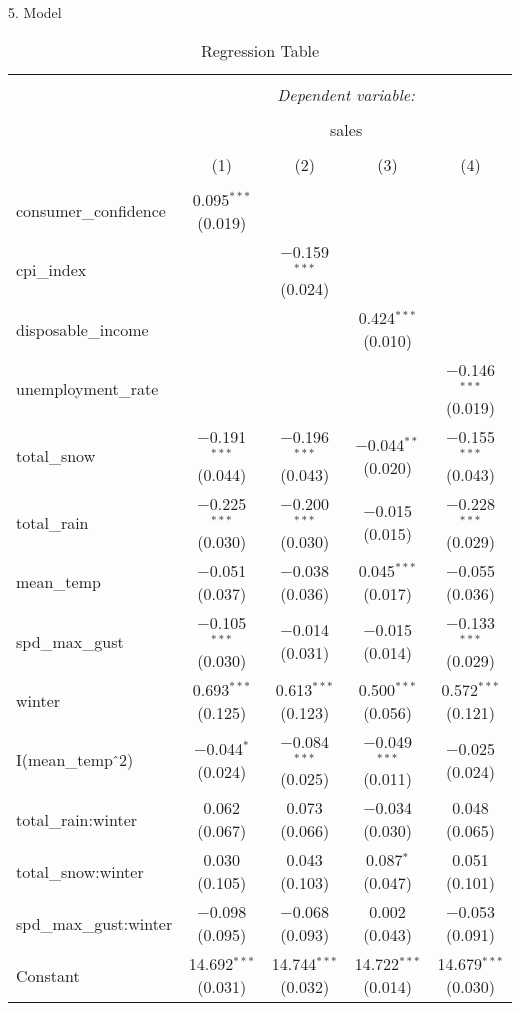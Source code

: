 \documentclass[
  ignorenonframetext,
]{beamer}
\begin{document}
\begin{frame}{5. Model}
\protect\hypertarget{model}{}
\begin{table}[H] \centering 
  \caption{Regression Table} 
  \label{tab1} 
\begin{tabular}{@{\extracolsep{5pt}}lcccc} 
\\[-1.8ex]\hline 
\hline \\[-1.8ex] 
 & \multicolumn{4}{c}{\textit{Dependent variable:}} \\ 
\cline{2-5} 
\\[-1.8ex] & \multicolumn{4}{c}{sales} \\ 
\\[-1.8ex] & (1) & (2) & (3) & (4)\\ 
\hline \\[-1.8ex] 
 consumer\_confidence & 0.095$^{***}$ (0.019) &  &  &  \\ 
  cpi\_index &  & $-$0.159$^{***}$ (0.024) &  &  \\ 
  disposable\_income &  &  & 0.424$^{***}$ (0.010) &  \\ 
  unemployment\_rate &  &  &  & $-$0.146$^{***}$ (0.019) \\ 
  total\_snow & $-$0.191$^{***}$ (0.044) & $-$0.196$^{***}$ (0.043) & $-$0.044$^{**}$ (0.020) & $-$0.155$^{***}$ (0.043) \\ 
  total\_rain & $-$0.225$^{***}$ (0.030) & $-$0.200$^{***}$ (0.030) & $-$0.015 (0.015) & $-$0.228$^{***}$ (0.029) \\ 
  mean\_temp & $-$0.051 (0.037) & $-$0.038 (0.036) & 0.045$^{***}$ (0.017) & $-$0.055 (0.036) \\ 
  spd\_max\_gust & $-$0.105$^{***}$ (0.030) & $-$0.014 (0.031) & $-$0.015 (0.014) & $-$0.133$^{***}$ (0.029) \\ 
  winter & 0.693$^{***}$ (0.125) & 0.613$^{***}$ (0.123) & 0.500$^{***}$ (0.056) & 0.572$^{***}$ (0.121) \\ 
  I(mean\_temp$\hat{\mkern6mu}$2) & $-$0.044$^{*}$ (0.024) & $-$0.084$^{***}$ (0.025) & $-$0.049$^{***}$ (0.011) & $-$0.025 (0.024) \\ 
  total\_rain:winter & 0.062 (0.067) & 0.073 (0.066) & $-$0.034 (0.030) & 0.048 (0.065) \\ 
  total\_snow:winter & 0.030 (0.105) & 0.043 (0.103) & 0.087$^{*}$ (0.047) & 0.051 (0.101) \\ 
  spd\_max\_gust:winter & $-$0.098 (0.095) & $-$0.068 (0.093) & 0.002 (0.043) & $-$0.053 (0.091) \\ 
  Constant & 14.692$^{***}$ (0.031) & 14.744$^{***}$ (0.032) & 14.722$^{***}$ (0.014) & 14.679$^{***}$ (0.030) \\ 

\end{tabular}
\end{table}
\end{frame}
\end{document}
